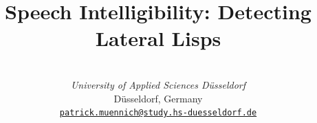 \documentclass{IEEEtran}
\begin{document}
\title{Speech Intelligibility: Detecting Lateral Lisps}
\date{}
\author{\\
\textit{University of Applied Sciences D\"usseldorf}\\
D\"usseldorf, Germany \\
\href{mailto:patrick.muennich@study.hs-duesseldorf.de}{\texttt{patrick.muennich@study.hs-duesseldorf.de}}}
\maketitle

\begin{abstract}


\end{abstract}
\end{document}
